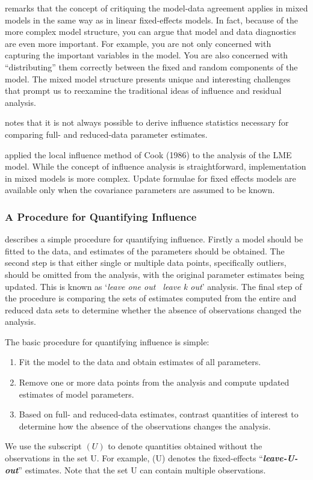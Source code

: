 \documentclass[12pt, a4paper]{report}
\theoremstyle{plain}
\theoremstyle{definition}
\theoremstyle{remark}
\begin{document}
	\citet{schabenberger} remarks that the concept of critiquing the model-data agreement applies in mixed models in the same way as in linear
	fixed-effects models. In fact, because of the more complex model structure, you can argue that model and
	data diagnostics are even more important. For example, you are not only concerned with capturing the
	important variables in the model. You are also concerned with ``distributing” them correctly between the
	fixed and random components of the model. The mixed model structure presents unique and interesting
	challenges that prompt us to reexamine the traditional ideas of influence and residual analysis.
	
	
	
	\citet{schabenberger} notes that it is not always possible to derive influence statistics necessary for comparing full- and
	reduced-data parameter estimates. 
	

		\citet{Beckman} applied the local influence method of Cook (1986) to the analysis of the LME model.
		While the concept of influence analysis is straightforward, implementation in mixed models is more complex. Update formulae for fixed effects models are available only when the covariance parameters are assumed to be known.
	
	
	\subsubsection{A Procedure for Quantifying Influence}  %
	\citet{schabenberger} describes a simple procedure for quantifying influence. Firstly a model should be fitted to the data, and
	estimates of the parameters should be obtained. The second step is that either single or multiple data points, specifically outliers,
	should be omitted from the analysis, with the original parameter estimates being updated. This is known as `\textit{leave one out \ leave k out}' analysis. The final step of the procedure is comparing the sets of estimates computed from the entire and reduced data sets to determine whether the absence of observations changed the
	analysis.
	

	The basic procedure for quantifying influence is simple:
	
	\begin{enumerate}
		\item Fit the model to the data and obtain estimates of all parameters.
		\item Remove one or more data points from the analysis and compute updated estimates of model parameters.
		\item Based on full- and reduced-data estimates, contrast quantities of interest to determine how the absence
		of the observations changes the analysis.
	\end{enumerate}
	We use the subscript $(U)$ to denote quantities obtained without the observations in the set U. For example,
	(U) denotes the fixed-effects “\textit{\textbf{leave-U-out}}” estimates. Note that the set U can contain multiple observations.
	
\end{document}
